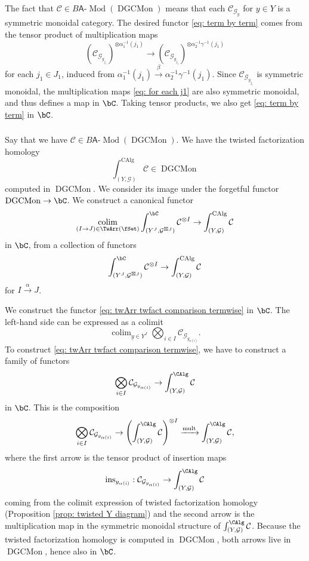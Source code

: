 \documentclass[10pt]{amsart}
\newcommand{\sssec}{\subsubsection}
\theoremstyle{remark}
\newcommand{\ul}{\underline}
\newcommand{\on}{\operatorname}
\newcommand{\cC}{\mathcal{C}}
\newcommand{\cG}{\mathcal{G}}
\newcommand{\DGCatSymMon}{\on{DGCMon}}
\newcommand{\lMod}{\text{-}\on{Mod}}
\DeclareMathOperator{\colim}{colim}
\newcommand{\sfA}{\mathsf{A}}
\begin{document}
The fact that $\cC\in B\sfA\lMod(\DGCatSymMon)$ means that each $\cC_{\cG_y}$ for $y\in Y$ is a symmetric monoidal category. The desired functor \eqref{eq: term by term} comes from the tensor product of multiplication maps
\begin{equation}\label{eq: for each j1}
    (\cC_{\cG_{y_{j_1}}})^{\otimes \alpha^{-1}_1(j_1)}\rightarrow (\cC_{\cG_{y_{j_1}}})^{\otimes \alpha^{-1}_2\gamma^{-1}(j_1)}
\end{equation}
for each $j_1\in J_1$, induced from
$\alpha^{-1}_1(j_1)\xrightarrow{\beta} \alpha^{-1}_2\gamma^{-1}(j_1)$.
Since $\cC_{\cG_{y_{j_1}}}$ is symmetric monoidal, the multiplication maps \eqref{eq: for each j1} are also symmetric monoidal, and thus defines a map in $\bC$. Taking tensor products, we also get \eqref{eq: term by term} in $\bC$.




\sssec{}
Say that we have $\cC\in B\sfA\lMod(\DGCatSymMon)$. We have the twisted factorization homology
    \[\int^{\on{CAlg}}_{(Y,\cG)}\cC \in\DGCatSymMon\]
    computed in $\DGCatSymMon$. We consider its image under the forgetful functor $\DGCatSymMon\rightarrow \bC$.
        We construct a canonical functor
    \begin{equation}\label{eq: twArr twfact comparison}
        \colim_{(I\rightarrow J)\in\TwArr(\fSet)} \int^{\bC}_{(Y^J,\cG^{\boxtimes J})} \cC^{\otimes I} \rightarrow \int^{\on{CAlg}}_{(Y,\cG)}\cC
    \end{equation}
    in $\bC$, from a collection of functors
    \begin{equation}\label{eq: twArr twfact comparison termwise}
        \int^{\bC}_{(Y^J,\cG^{\boxtimes J})} \cC^{\otimes I} \rightarrow \int^{\on{CAlg}}_{(Y,\cG)}\cC
    \end{equation}
    for $I\xrightarrow{\alpha}J$.
    \medskip

    We construct the functor \eqref{eq: twArr twfact comparison termwise} in $\bC$. The left-hand side can be expressed as a colimit
    \[\colim_{\ul{y}\in Y^J}  \bigotimes_{i\in I}\cC_{\cG_{y_{\alpha(i)}}}. \]
    To construct \eqref{eq: twArr twfact comparison termwise}, we have to  construct a family of functors
    \[\bigotimes_{i\in I}\cC_{\cG_{y_{\alpha(i)}}}\rightarrow \int^{\CAlg}_{(Y,\cG)}\cC\]
    in $\bC$. This is the composition
    \[\bigotimes_{i\in I}\cC_{\cG_{y_{\alpha(i)}}}\rightarrow \left(\int^{\CAlg}_{(Y,\cG)}\cC\right)^{\otimes I} \xrightarrow{\on{mult}} \int^{\CAlg}_{(Y,\cG)}\cC,\]
    where the first arrow is the tensor product of insertion maps
    \[\on{ins}_{y_{\alpha(i)}}:\cC_{\cG_{y_{\alpha(i)}}}\rightarrow\int^{\CAlg}_{(Y,\cG)}\cC\]
    coming from the colimit expression of twisted factorization homology (Proposition \ref{prop: twisted Y diagram}) and the second arrow is the multiplication map in the symmetric monoidal structure of
    $\int^{\CAlg}_{(Y,\cG)}\cC$. Because the twisted factorization homology is computed in $\DGCatSymMon$, both arrows live in $\DGCatSymMon$, hence also in $\bC$.
\end{document}
